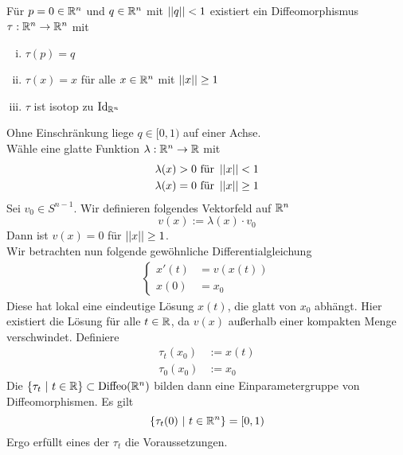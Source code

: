 \Lem{}
Für $p = 0 \in \mathbb{R}^n$ und $q \in \mathbb{R}^n$ mit $\left|\left|q\right|\right| < 1$ existiert ein Diffeomorphismus $\tau : \mathbb{R}^n \overset{}{\rightarrow} \mathbb{R}^n$ mit
\begin{enumerate}[i.]
	\item $\tau(p) = q$
	\item $\tau(x) = x$ für alle $x \in \mathbb{R}^n$ mit $\left|\left|x\right|\right| \geq 1$
	\item $\tau$ ist isotop zu $\text{Id}_{\mathbb{R}^n}$
\end{enumerate}
\begin{Beweis}{}
Ohne Einschränkung liege $q \in [0,1)$ auf einer Achse.\\
Wähle eine glatte Funktion $\lambda : \mathbb{R}^n \overset{}{\rightarrow} \mathbb{R}$ mit
\begin{align*}
\lambda(x) > 0 & \text{ für } \left|\left|x\right|\right| < 1\\
\lambda(x) = 0 & \text{ für } \left|\left|x\right|\right| \geq 1
\end{align*}
Sei $v_0 \in S^{n-1}$. Wir definieren folgendes Vektorfeld auf $\mathbb{R}^n$
\[ v(x) := \lambda(x) \cdot v_0 \]
Dann ist $v(x) = 0$ für $\left|\left|x\right|\right| \geq 1$.\\
Wir betrachten nun folgende gewöhnliche Differentialgleichung
\begin{align*}
\left\lbrace
\begin{aligned}
x'(t) &= v(x(t))\\
x(0) &=x_0
\end{aligned}
\right.
\end{align*}
Diese hat lokal eine eindeutige Lösung $x(t)$, die glatt von $x_0$ abhängt. Hier existiert die Lösung für alle $t \in \mathbb{R}$, da $v(x)$ außerhalb einer kompakten Menge verschwindet. Definiere
\begin{align*}
\tau_t(x_0) &:= x(t)\\
\tau_0(x_0) &:= x_0
\end{align*}
Die $\{\tau_t~|~ t\in \mathbb{R}\} \subset \text{Diffeo}(\mathbb{R}^n)$ bilden dann eine Einparametergruppe von Diffeomorphismen. Es gilt
\[ \set{ \tau_t(0) }{t \in \R^n} = [0,1) \]
Ergo erfüllt eines der $\tau_t$ die Voraussetzungen.
\end{Beweis}

